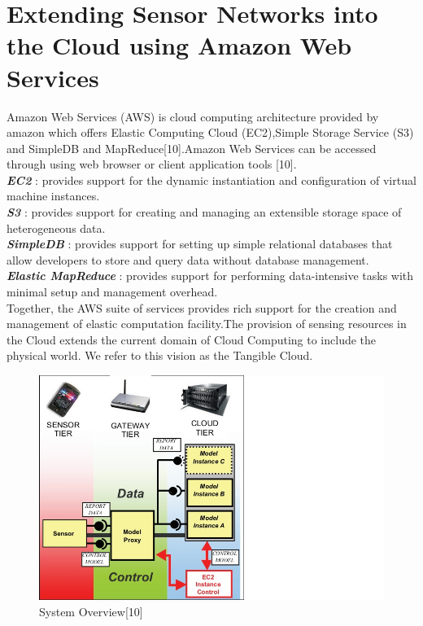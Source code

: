 \documentclass {report}
\begin{document}
\section{Extending Sensor Networks into the Cloud using Amazon Web Services}
Amazon Web Services (AWS) is cloud computing architecture provided by amazon which offers Elastic Computing Cloud (EC2),Simple Storage Service (S3) and SimpleDB and MapReduce[10].Amazon Web Services
can be accessed through using web browser or client application tools [10].\\
\emph{{\bfseries EC2}} : provides support for the dynamic instantiation and configuration of virtual machine instances.\\
\emph{{\bfseries S3}} : provides support for creating and managing an extensible storage space of heterogeneous data.\\
\emph{{\bfseries SimpleDB}} : provides support for setting up simple relational databases that allow developers to store and query data without database management.\\
\emph{{\bfseries Elastic MapReduce}} : provides support for performing data-intensive tasks with minimal setup and management overhead.\\
\indent Together, the AWS suite of services provides rich support for the creation and management of elastic computation facility.The provision of sensing resources in the Cloud extends the current 
domain of Cloud Computing to include the physical world. We refer to this vision as the Tangible Cloud.\\

\begin{figure}
\begin{center}
\includegraphics [scale=0.5]{amazon}
\caption{System Overview[10]}
\end{center}
\end{figure}
\end{document}
